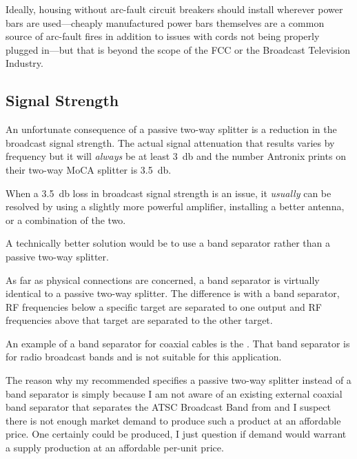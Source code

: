 Ideally, housing without arc-fault circuit breakers should install
wherever power bars are used---cheaply manufactured power bars themselves are a common source of
arc-fault fires in addition to issues with cords not being properly plugged in---but that is beyond
the scope of the FCC or the Broadcast Television Industry.

\subsection{Signal Strength}
\label{apx:moca:signalstrength}

An unfortunate consequence of a passive two-way splitter is a reduction in the broadcast signal
strength. The actual signal attenuation that results varies by frequency but it will \emph{always}
be at least \qty{3}{\decibel} and the number Antronix prints on their two-way MoCA splitter is
\qty{3.5}{\decibel}.

When a \qty{3.5}{\decibel} loss in broadcast signal strength is an issue, it \emph{usually} can
be resolved by using a slightly more powerful amplifier, installing a better antenna, or a
combination of the two.

A technically better solution would be to use a band separator rather than a passive two-way
splitter.

As far as physical connections are concerned, a band separator is virtually identical to a
passive two-way splitter. The difference is with a band separator, RF frequencies below a
specific target are separated to one output and RF frequencies above that target are separated
to the other target.

An example of a band separator for coaxial cables is the
.
That band separator is for radio broadcast bands and is not suitable for this application.

The reason why my recommended  specifies a passive two-way splitter
instead of a band separator is simply because I am not aware of an existing external coaxial
band separator that separates the ATSC Broadcast Band from \xdband{} and I suspect there
is not enough market demand to produce such a product at an affordable price. One certainly
could be produced, I just question if demand would warrant a supply production at an affordable
per-unit price.






